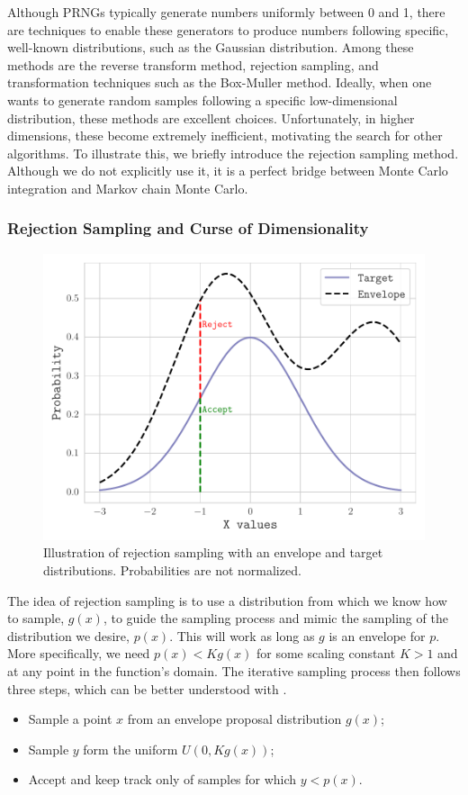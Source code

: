 Although PRNGs typically generate numbers uniformly between 0 and 1, there are techniques to enable these generators to produce numbers following specific, well-known distributions, such as the Gaussian distribution. Among these methods are the reverse transform method, rejection sampling, and transformation techniques such as the Box-Muller method. Ideally, when one wants to generate random samples following a specific low-dimensional distribution, these methods are excellent choices. Unfortunately, in higher dimensions, these become extremely inefficient, motivating the search for other algorithms. To illustrate this, we briefly introduce the rejection sampling method. Although we do not explicitly use it, it is a perfect bridge between Monte Carlo integration and Markov chain Monte Carlo.

\subsubsection{Rejection Sampling and Curse of Dimensionality}

\begin{figure}[h]
    \centering
    \includegraphics[width=0.6\linewidth]{Chapters/Theoretical_Background/images/rejection_sampling.pdf}
    \caption{Illustration of rejection sampling with an envelope and target distributions. Probabilities are not normalized.}
    \label{fig:rej}
\end{figure}

The idea of rejection sampling is to use a distribution from which we know how to sample, $g(x)$, to guide the sampling process and mimic the sampling of the distribution we desire, $p(x)$. This will work as long as $g$ is an envelope for $p$. More specifically, we need $p(x) < K g(x)$ for some scaling constant $K > 1$ and at any point in the function's domain. The iterative sampling process then follows three steps, which can be better understood with .
\begin{itemize}
    \item Sample a point $x$ from an envelope proposal distribution $g(x)$;
    \item Sample $y$ form the uniform $U(0, Kg(x))$;
    \item Accept and keep track only of samples for which $y < p(x)$.
\end{itemize}

